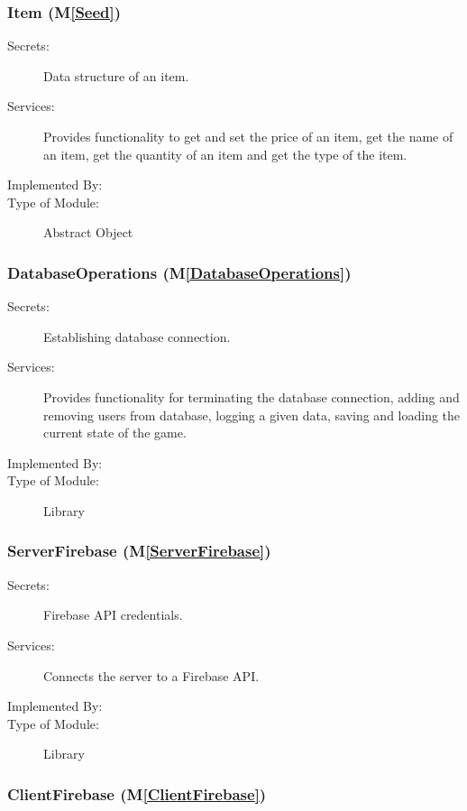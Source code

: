 \documentclass[12pt, titlepage]{article}
\newcommand{\mref}[1]{M\ref{#1}}
\begin{document}
\subsubsection{Item (\mref{Seed})}

\begin{description}
\item[Secrets:] Data structure of an item.
\item[Services:] Provides functionality to get and set the price of an item, get the name of an item, get the quantity of an item and get the type of the item.
\item[Implemented By:]  \progname
\item[Type of Module:] Abstract Object
\end{description}

\subsubsection{DatabaseOperations (\mref{DatabaseOperations})}

\begin{description}
\item[Secrets:] Establishing database connection.
\item[Services:] Provides functionality for terminating the database connection, adding and removing users from database, logging a given data, saving and loading the current state of the game.
\item[Implemented By:]  \progname
\item[Type of Module:] Library
\end{description}

\subsubsection{ServerFirebase (\mref{ServerFirebase})}

\begin{description}
\item[Secrets:] Firebase API credentials.
\item[Services:] Connects the server to a Firebase API.
\item[Implemented By:]  \progname
\item[Type of Module:] Library
\end{description}

\subsubsection{ClientFirebase (\mref{ClientFirebase})}
\end{document}
